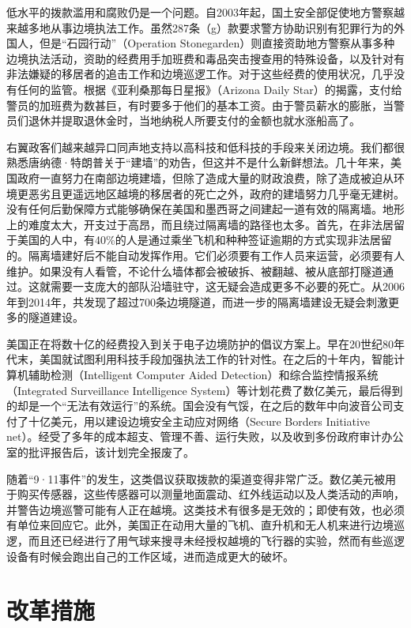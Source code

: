 \documentclass[fontset=fandol, a4paper, 12pt, openright]{ctexbook}
\begin{document}
低水平的拨款滥用和腐败仍是一个问题。自2003年起，国土安全部促使地方警察越来越多地从事边境执法工作。虽然287条（g）款要求警方协助识别有犯罪行为的外国人，但是“石园行动”（Operation Stonegarden）则直接资助地方警察从事多种边境执法活动，资助的经费用手加班费和毒品突击搜查用的特殊设备，以及针对有非法嫌疑的移居者的追击工作和边境巡逻工作。对于这些经费的使用状况，几乎没有任何的监管。根据《亚利桑那每日星报》（Arizona Daily Star）的揭露，支付给警员的加班费为数甚巨，有时要多于他们的基本工资。由于警员薪水的膨胀，当警员们退休并提取退休金时，当地纳税人所要支付的金额也就水涨船高了。

右翼政客们越来越异口同声地支持以高科技和低科技的手段来关闭边境。我们都很熟悉唐纳德·特朗普关于“建墙”的劝告，但这并不是什么新鲜想法。几十年来，美国政府一直努力在南部边境建墙，但除了造成大量的财政浪费，除了造成被迫从环境更恶劣且更遥远地区越境的移居者的死亡之外，政府的建墙努力几乎毫无建树。没有任何后勤保障方式能够确保在美国和墨西哥之间建起一道有效的隔离墙。地形上的难度太大，开支过于高昂，而且绕过隔离墙的路径也太多。首先，在非法居留于美国的人中，有40\%的人是通过乘坐飞机和种种签证逾期的方式实现非法居留的。隔离墙建好后不能自动发挥作用。它们必须要有工作人员来运营，必须要有人维护。如果没有人看管，不论什么墙体都会被破拆、被翻越、被从底部打隧道通过。这就需要一支庞大的部队沿墙驻守，这无疑会造成更多不必要的死亡。从2006年到2014年，共发现了超过700条边境隧道，而进一步的隔离墙建设无疑会刺激更多的隧道建设。

美国正在将数十亿的经费投入到关于电子边境防护的倡议方案上。早在20世纪80年代末，美国就试图利用科技手段加强执法工作的针对性。在之后的十年内，智能计算机辅助检测（Intelligent Computer Aided Detection）和综合监控情报系统（Integrated Surveillance Intelligence System）等计划花费了数亿美元，最后得到的却是一个“无法有效运行”的系统。国会没有气馁，在之后的数年中向波音公司支付了十亿美元，用以建设边境安全主动应对网络（Secure Borders Initiative net）。经受了多年的成本超支、管理不善、运行失败，以及收到多份政府审计办公室的批评报告后，该计划完全报废了。

随着“9·11事件”的发生，这类倡议获取拨款的渠道变得非常广泛。数亿美元被用于购买传感器，这些传感器可以测量地面震动、红外线运动以及人类活动的声响，并警告边境巡警可能有人正在越境。这类技术有很多是无效的；即使有效，也必须有单位来回应它。此外，美国正在动用大量的飞机、直升机和无人机来进行边境巡逻，而且还已经进行了用气球来搜寻未经授权越境的飞行器的实验，然而有些巡逻设备有时候会跑出自己的工作区域，进而造成更大的破坏。

\section{改革措施}
\end{document}
